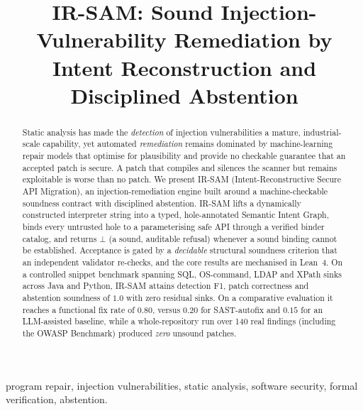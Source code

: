 \documentclass[conference]{IEEEtran}
\newcommand{\bottom}{\ensuremath{\bot}}
\newcommand{\irsam}{IR-SAM}
\begin{document}
\title{\irsam{}: Sound Injection-Vulnerability Remediation by\\
Intent Reconstruction and Disciplined Abstention}

\author{
}

\maketitle

\begin{abstract}
Static analysis has made the \emph{detection} of injection
vulnerabilities a mature, industrial-scale capability, yet automated
\emph{remediation} remains dominated by machine-learning repair models
that optimise for plausibility and provide no checkable guarantee that an
accepted patch is secure. A patch that compiles and silences the scanner
but remains exploitable is worse than no patch. We present \irsam{}
(Intent-Reconstructive Secure API Migration), an injection-remediation
engine built around a machine-checkable soundness contract with
disciplined abstention. \irsam{} lifts a dynamically constructed
interpreter string into a typed, hole-annotated Semantic Intent Graph,
binds every untrusted hole to a parameterising safe API through a verified
binder catalog, and returns \bottom{} (a sound, auditable refusal)
whenever a sound binding cannot be established. Acceptance is gated by a
\emph{decidable} structural soundness criterion that an independent
validator re-checks, and the core results are mechanised in Lean~4. On a
controlled snippet benchmark spanning SQL, OS-command, LDAP and XPath
sinks across Java and Python, \irsam{} attains detection F1, patch
correctness and abstention soundness of $1.0$ with zero residual sinks. On
a comparative evaluation it reaches a functional fix rate of $0.80$,
versus $0.20$ for SAST-autofix and $0.15$ for an LLM-assisted baseline,
while a whole-repository run over 140 real findings (including the OWASP
Benchmark) produced \emph{zero} unsound patches.
\end{abstract}

\begin{IEEEkeywords}
program repair, injection vulnerabilities, static analysis, software
security, formal verification, abstention.
\end{IEEEkeywords}

\end{document}
